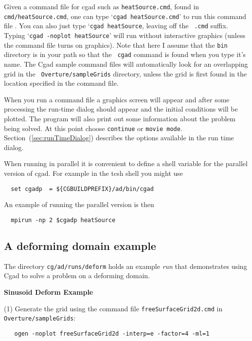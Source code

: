\documentclass[11pt]{article}
\newcommand{\Index}[1]{#1\index{#1}}
\begin{document}
Given a \Index{command file} for cgad such as {\tt heatSource.cmd}, found in {\tt
cmd/heatSource.cmd}, one can type `{\tt cgad heatSource.cmd}' to run this command
file . You can also just type `{\tt cgad heatSource}, leaving off the {\tt
.cmd} suffix. Typing `{\tt cgad -noplot heatSource}' will run without
interactive graphics (unless the command file turns on graphics). Note that here
I assume that the {\tt bin} directory is in your path so that the {\tt
cgad} command is found when you type it's name. The Cgad sample
command files will automatically look for an overlapping grid in the {\tt
Overture/sampleGrids} directory, unless the grid is first found in the location
specified in the command file.

When you run a command file a graphics screen will appear and after some
processing the run-time dialog should appear and the initial conditions will be
plotted. The program will also print out some information about the problem
being solved. At this point choose {\tt continue} or {\tt movie
mode}. Section~(\ref{sec:runTimeDialog}) describes the options available in the
run time dialog.

When running in parallel it is convenient to define a shell variable for the parallel
version of cgad.
For example in the tcsh shell you might use
\begin{verbatim}
  set cgadp  = ${CGBUILDPREFIX}/ad/bin/cgad
\end{verbatim} %
An example of running the parallel version is then
\begin{verbatim}
  mpirun -np 2 $cgadp heatSource
\end{verbatim} %


\clearpage
\subsection{A deforming domain example} \label{sec:deform}


The directory {\tt cg/ad/runs/deform} holds an example {\em run} that demonstrates using Cgad to solve 
a problem on a deforming domain.



\noindent \textbf{Sinusoid Deform Example}

\noindent (1) Generate the grid using the command file {\tt freeSurfaceGrid2d.cmd} in {\tt Overture/sampleGrids}:
\begin{verbatim}
   ogen -noplot freeSurfaceGrid2d -interp=e -factor=4 -ml=1 
\end{verbatim}
\end{document}
